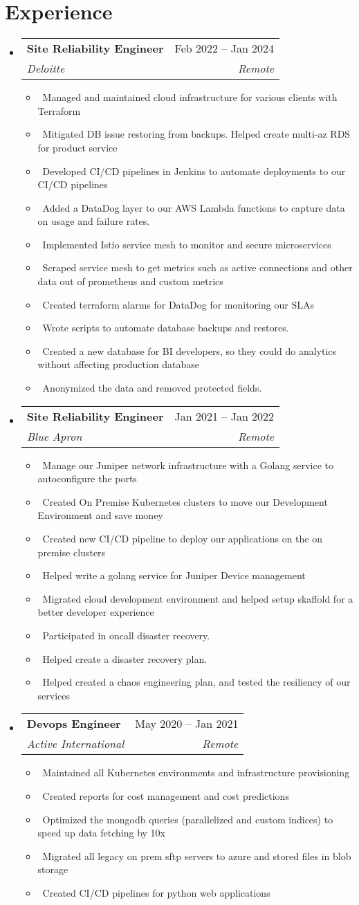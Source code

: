 \documentclass[letterpaper,10pt]{article}
\makeatletter
\newcommand{\resumeItem}[1]{\item\small{#1}}
\newcommand{\resumeSubheading}[4]{
\vspace{-1pt}\item
  \begin{tabular*}{0.97\textwidth}[t]{l@{\extracolsep{\fill}}r}
    \textbf{#1} & #2 \\
    \textit{#3} & \textit{#4} \\
  \end{tabular*}\vspace{-7pt}
}
\newcommand{\resumeSubHeadingList}{\begin{itemize}[leftmargin=0.15in, label={}]}
\newcommand{\resumeSubHeadingListEnd}{\end{itemize}}
\makeatother
\begin{document}
\section{Experience}
\resumeSubHeadingList
  \resumeSubheading
      {Site Reliability Engineer}{Feb 2022 -- Jan 2024}
      {Deloitte}{Remote}
      \resumeSubHeadingList
          \resumeItem{\textbullet\ Managed and maintained cloud infrastructure for various clients with Terraform}
          \resumeItem{\textbullet\ Mitigated DB issue restoring from backups. Helped create multi-az RDS for product service}
          \resumeItem{\textbullet\ Developed CI/CD pipelines in Jenkins to automate deployments to our CI/CD pipelines}
          \resumeItem{\textbullet\ Added a DataDog layer to our AWS Lambda functions to capture data on usage and failure rates.}
          \resumeItem{\textbullet\ Implemented Istio service mesh to monitor and secure microservices}
          \resumeItem{\textbullet\ Scraped service mesh to get metrics such as active connections and other data out of prometheus and custom metrics}
          \resumeItem{\textbullet\ Created terraform alarms for DataDog for monitoring our SLAs}
          \resumeItem{\textbullet\ Wrote scripts to automate database backups and restores.}
          \resumeItem{\textbullet\ Created a new database for BI developers, so they could do analytics without affecting production database}
          \resumeItem{\textbullet\ Anonymized the data and removed protected fields.}
      \resumeSubHeadingListEnd
  \resumeSubheading
      {Site Reliability Engineer}{Jan 2021 -- Jan 2022}
      {Blue Apron}{Remote}
      \resumeSubHeadingList
          \resumeItem{\textbullet\ Manage our Juniper network infrastructure with a Golang service to autoconfigure the ports}
          \resumeItem{\textbullet\ Created On Premise Kubernetes clusters to move our Development Environment and save money}
          \resumeItem{\textbullet\ Created new CI/CD pipeline to deploy our applications on the on premise clusters}
          \resumeItem{\textbullet\ Helped write a golang service for Juniper Device management}
          \resumeItem{\textbullet\ Migrated cloud development environment and helped setup skaffold for a better developer experience}
          \resumeItem{\textbullet\ Participated in oncall disaster recovery.}
          \resumeItem{\textbullet\ Helped create a disaster recovery plan.}
          \resumeItem{\textbullet\ Helped created a chaos engineering plan, and tested the resiliency of our services}
      \resumeSubHeadingListEnd
      \resumeSubheading
      {Devops Engineer}{May 2020 -- Jan 2021}
      {Active International}{Remote}
      \resumeSubHeadingList
          \resumeItem{\textbullet\ Maintained all Kubernetes environments and infrastructure provisioning}
          \resumeItem{\textbullet\ Created reports for cost management and cost predictions}
          \resumeItem{\textbullet\ Optimized the mongodb queries (parallelized and custom indices) to speed up data fetching by 10x}
          \resumeItem{\textbullet\ Migrated all legacy on prem sftp servers to azure and stored files in blob storage}
          \resumeItem{\textbullet\ Created CI/CD pipelines for python web applications}
      \resumeSubHeadingListEnd
\resumeSubHeadingListEnd
\end{document}
